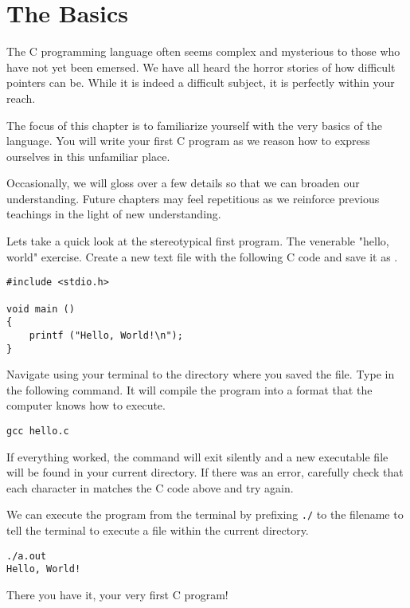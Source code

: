 \chapter{The Basics}

The C programming language often seems complex and mysterious to those who have
not yet been emersed. We have all heard the horror stories of how difficult
pointers can be. While it is indeed a difficult subject, it is perfectly within
your reach.

The focus of this chapter is to familiarize yourself with the very basics of
the language. You will write your first C program as we reason how to express
ourselves in this unfamiliar place.

Occasionally, we will gloss over a few details so that we can broaden our
understanding. Future chapters may feel repetitious as we reinforce previous
teachings in the light of new understanding.

Lets take a quick look at the stereotypical first program. The venerable
"hello, world" exercise. Create a new text file with the following C code and
save it as .

\begin{Verbatim}
#include <stdio.h>

void main ()
{
    printf ("Hello, World!\n");
}
\end{Verbatim}

Navigate using your terminal to the directory where you saved the file. Type in
the following command. It will compile the program into a format that the
computer knows how to execute.

\begin{Verbatim}
gcc hello.c
\end{Verbatim}

If everything worked, the  command will exit silently and a new
executable file  will be found in your current directory. If there
was an error, carefully check that each character in  matches the
C code above and try again.

We can execute the program from the terminal by prefixing \verb|./| to the
filename to tell the terminal to execute a file within the current directory.

\begin{Verbatim}
./a.out
Hello, World!
\end{Verbatim}

There you have it, your very first C program!

